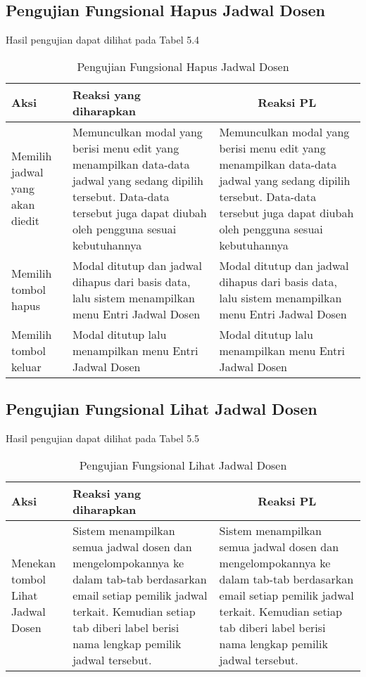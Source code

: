 \subsection{Pengujian Fungsional Hapus Jadwal Dosen}
Hasil pengujian dapat dilihat pada Tabel 5.4
\begin{center}
	\begin{table}[H]
		\begin{tabular}{|p{5cm}|p{5cm}|p{5cm}|}
		\hline
		\centering Aksi	& 	\centering Reaksi yang diharapkan &  \multicolumn{1}{c|}{Reaksi PL} \\
		\hline
		Memilih jadwal yang akan diedit & Memunculkan modal yang berisi menu edit yang menampilkan data-data jadwal yang sedang dipilih tersebut. Data-data tersebut juga dapat diubah oleh pengguna sesuai kebutuhannya & Memunculkan modal yang berisi menu edit yang menampilkan data-data jadwal yang sedang dipilih tersebut. Data-data tersebut juga dapat diubah oleh pengguna sesuai kebutuhannya \\
		\hline
		Memilih tombol hapus & Modal ditutup dan jadwal dihapus dari basis data, lalu sistem menampilkan menu Entri Jadwal Dosen & Modal ditutup dan jadwal dihapus dari basis data, lalu sistem menampilkan menu Entri Jadwal Dosen \\
		\hline
		Memilih tombol keluar & Modal ditutup lalu menampilkan menu Entri Jadwal Dosen & Modal ditutup lalu menampilkan menu Entri Jadwal Dosen \\
		\hline
		\end{tabular}
		\caption{Pengujian Fungsional Hapus Jadwal Dosen}
	\end{table}
\end{center}

\subsection{Pengujian Fungsional Lihat Jadwal Dosen}
Hasil pengujian dapat dilihat pada Tabel 5.5
\begin{center}
	\begin{table}[H]
		\begin{tabular}{|p{5cm}|p{5cm}|p{5cm}|}
		\hline
		\centering Aksi	& 	\centering Reaksi yang diharapkan &  \multicolumn{1}{c|}{Reaksi PL} \\
		\hline
		Menekan tombol Lihat Jadwal Dosen & 
		Sistem menampilkan semua jadwal dosen dan mengelompokannya ke dalam tab-tab berdasarkan email setiap pemilik jadwal terkait. Kemudian setiap tab diberi label berisi nama lengkap pemilik jadwal tersebut. &
		Sistem menampilkan semua jadwal dosen dan mengelompokannya ke dalam tab-tab berdasarkan email setiap pemilik jadwal terkait. Kemudian setiap tab diberi label berisi nama lengkap pemilik jadwal tersebut.\\
		\hline
		\end{tabular}
		\caption{Pengujian Fungsional Lihat Jadwal Dosen}
	\end{table}
\end{center}

